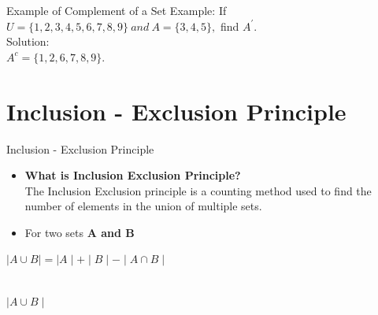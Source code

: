 \documentclass{beamer}
\begin{document}
\begin{frame}{Example of Complement of a Set }
    Example: If  $U = \{1,2, 3,4,5,6,7,8,9\}\ and\ A = \{3, 4, 5\},$ find $A^{'}$.\\
Solution:\\
\centering
$A^{c} = \{1,2,6,7,8,9\}.$
\end{frame}

\section{Inclusion - Exclusion Principle}
\begin{frame}[fragile]{Inclusion - Exclusion Principle}
\begin{itemize}
    \item \textbf{What is Inclusion Exclusion Principle?}\\
    \quad The Inclusion Exclusion principle is a counting method used to find the number of elements in the union of multiple sets.

\item For two sets \textbf{A and B} \\
\end{itemize}
\begin{center}
$ \mid A \cup B \mid = \mid A \mid + \mid B \mid - \mid A\cap B \mid $
\vspace{1 em}
\\
\setlength{\fboxsep}{8pt}
\\
\end{center}
\begin{center}
 {$ \mid A \cup B \mid $}   
\end{center}

\end{frame}
\end{document}
